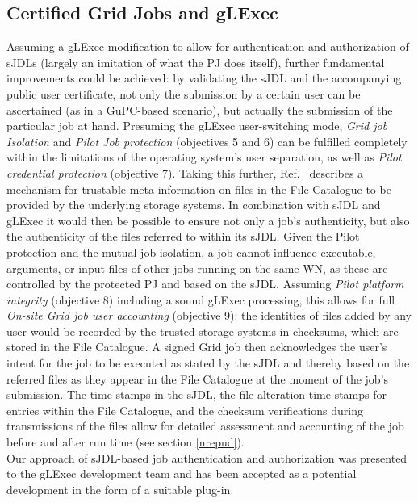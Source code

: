 \documentclass[10pt]{iopart}
\begin{document}
\subsection{Certified Grid Jobs and gLExec}
\label{sjdlgl}
Assuming a gLExec modification to allow for authentication and authorization of
sJDLs (largely an imitation of what the PJ does itself),
further fundamental improvements could be achieved: by validating the
sJDL and
the accompanying public user certificate, not only the submission by a certain user
can be ascertained (as in a GuPC-based scenario), but actually the submission of
the particular job at hand. Presuming the gLExec user-switching mode, \textit{Grid
job Isolation} and \textit{Pilot Job protection} (objectives 5 and 6) can be
fulfilled completely within the limitations of the operating
system's user separation, as well as \textit{Pilot credential protection} (objective 7).
Taking this further, Ref.~
describes a mechanism for trustable meta information on files in the File Catalogue to be
provided by the underlying storage systems. In combination with sJDL and
gLExec it would then be possible to ensure not only a job's authenticity, but also the
authenticity of the files referred to within its sJDL. Given the Pilot
protection and the mutual job isolation, a job cannot influence executable,
arguments, or input files of other jobs running on the same WN,
as these are controlled by the protected PJ and based on the sJDL.
Assuming \textit{Pilot platform integrity} (objective 8) including a sound
gLExec processing, this allows for full \textit{On-site Grid job
user accounting} (objective 9): the identities of files added by any user
would be recorded by the trusted storage systems in checksums, which are stored in
the File Catalogue.  A signed Grid job then acknowledges the user's intent for the
job to be executed as stated by the sJDL and thereby based on the referred files
as they appear in the File Catalogue at the moment of the job's submission. The time
stamps in the sJDL, the file alteration time stamps for
entries within the File Catalogue, and the checksum verifications during
transmissions of the files allow for detailed assessment and accounting of the
job before and after run time (see section \ref{nrepud}).\\
Our approach of sJDL-based job authentication and
authorization was presented to the gLExec development team and
has been accepted as a potential development in the form of a suitable plug-in.
\end{document}
